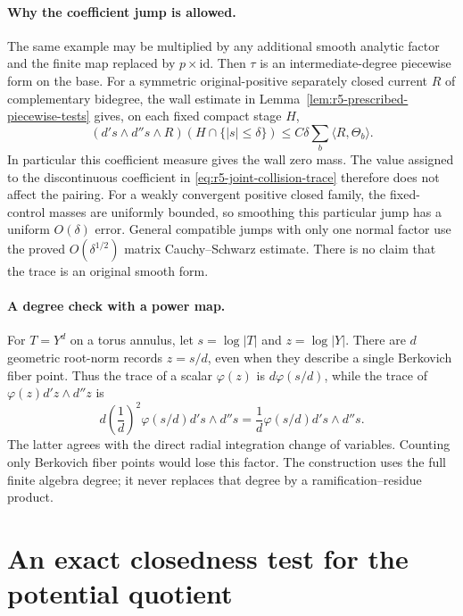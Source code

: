 \documentclass[11pt,a4paper]{article}
\numberwithin{equation}{section}
\theoremstyle{definition}
\theoremstyle{remark}
\begin{document}
\paragraph{Why the coefficient jump is allowed.}
The same example may be multiplied by any additional smooth
analytic factor and the finite map replaced by $p\times\mathrm{id}$.
Then $\tau$ is an intermediate-degree piecewise form on the base.
For a symmetric original-positive separately closed current $R$
of complementary bidegree, the wall estimate in
Lemma~\ref{lem:r5-prescribed-piecewise-tests} gives, on each fixed
compact stage $H$,
\[
 (d's\wedge d''s\wedge R)
                  (H\cap\{|s|\leq\delta\})
                       \leq C\delta\sum_b\langle R,\Theta_b\rangle.
\]
In particular this coefficient measure gives the wall zero mass.
The value assigned to the discontinuous coefficient in
\eqref{eq:r5-joint-collision-trace} therefore does not affect
the pairing.  For a weakly convergent positive closed family,
the fixed-control masses are uniformly bounded, so smoothing
this particular jump has a uniform $O(\delta)$ error.  General
compatible jumps with only one normal factor use the proved
$O(\delta^{1/2})$ matrix Cauchy--Schwarz estimate.  There is
no claim that the trace is an original smooth form.

\paragraph{A degree check with a power map.}
For $T=Y^d$ on a torus annulus, let $s=\log|T|$ and
$z=\log|Y|$.  There are $d$ geometric root-norm records
$z=s/d$, even when they describe a single Berkovich fiber point.
Thus the trace of a scalar $\varphi(z)$ is
$d\varphi(s/d)$, while the trace of
$\varphi(z)d'z\wedge d''z$ is
\[
 d\left(\frac1d\right)^2\varphi(s/d)d's\wedge d''s
       =\frac1d\varphi(s/d)d's\wedge d''s.
\]
The latter agrees with the direct radial integration change of
variables.  Counting only Berkovich fiber points would lose this
factor.  The construction uses the full finite algebra degree;
it never replaces that degree by a ramification--residue product.



\section{An exact closedness test for the potential quotient}
\label{sec:r5-quotient-scope-checks}
\end{document}
